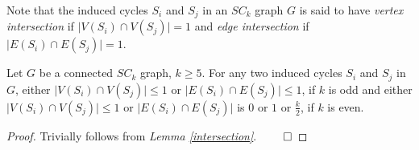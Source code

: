 \documentclass[runningheads]{llncs}
\begin{document}
                                                                                                                                                                               \noindent Note that the induced cycles $S_i$ and $S_j$ in an $SC_k$ graph $G$ is said to have \emph{vertex intersection} if $\vert V(S_i) \cap V(S_j) \vert = 1$ and \emph{edge intersection} if $\vert E(S_i) \cap E(S_j) \vert = 1$.
                                                                                                                                                                                                                                                                                                                                                               \begin{corollary}                                                                                                                                                                                                                                                                                                                                                                                                                                                                                                                                       \label{intersectionseparate} Let $G$ be a connected $SC_k$ graph, $k \geq 5$. For any two induced cycles $S_i$ and $S_j$ in $G$,  either $\vert V(S_i) \cap V(S_j) \vert \leq 1$ or $\vert E(S_i) \cap E(S_j) \vert \leq 1$, if $k$ is odd and either $\vert V(S_i) \cap V(S_j) \vert \leq 1$ or $\vert E(S_i) \cap E(S_j) \vert$ is $0$ or $1$ or $\frac{k}{2}$, if $k$ is even.                                                                                                                                                                                   \end{corollary}                                                                                                                                                                                                                                                                                                                                                            \begin{proof}                                                                                                                                                                              Trivially follows from \emph{Lemma \ref{intersection}}. $\hfill \qed$                                                                                                                                                                                  \end{proof}
\end{document}
